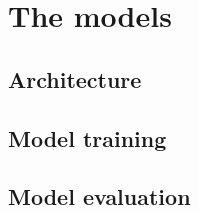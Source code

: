 
\section{The models}
\lipsum[1]

\subsection{Architecture}
\lipsum[1]

\subsection{Model training}
\lipsum[1]

\subsection{Model evaluation}
\lipsum[1]
